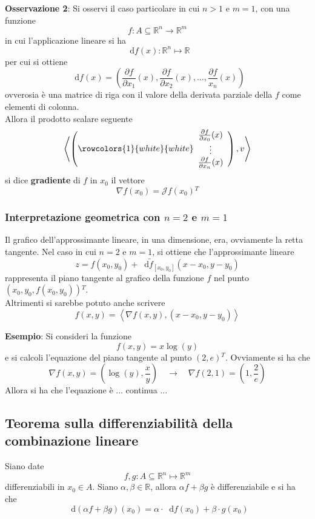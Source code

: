 \documentclass[a4paper]{extarticle}
\newcommand*\dif{\mathop{}\!\mathrm{d}}
\begin{document}
\vspace{2em}
\noindent
\textbf{Osservazione 2}: Si osservi il caso particolare in cui $n>1$ e $m=1$, con una funzione
\[f : A \subseteq \mathbb{R}^n \rightarrow \mathbb{R}^m\]
in cui l'applicazione lineare si ha
\[\dif f(x) : \mathbb{R}^n \longmapsto \mathbb{R}\]
per cui si ottiene
\[\dif f(x) = \left(\frac{\partial f}{\partial x_1}(x), \frac{\partial f}{\partial x_2}(x), \dots, \frac{\partial f}{x_n}(x) \right)\]
ovverosia è una matrice di riga con il valore della derivata parziale della $f$ come elementi di colonna.\\
Allora il prodotto scalare seguente
\[\left<
    \left(
        \rowcolors{1}{white}{white}
        \begin{array}{c}
            \frac{\partial f}{\partial x_0}(x)\\
            \vdots\\
            \frac{\partial f}{\partial x_n}(x)
        \end{array}
    \right), v
\right>\]
si dice \textbf{gradiente} di $f$ in $x_0$ il vettore
\[\nabla f(x_0) = \mathcal{J}f(x_0){^T}\]

\vspace{2em}
\noindent
\subsubsection{Interpretazione geometrica con $n=2$ e $m=1$}
Il grafico dell'approssimante lineare, in una dimensione, era, ovviamente la retta tangente. Nel caso in cui $n=2$ e $m=1$, si ottiene che l'approssimante lineare
\[z=f(x_0,y_0) + \dif \widetilde{f}_{[x_0,y_0]}(x-x_0,y-y_0)\]
rappresenta il piano tangente al grafico della funzione $f$ nel punto $\left(x_0,y_0,f(x_0,y_0)\right){^T}$.\\
Altrimenti si sarebbe potuto anche scrivere
\[f(x,y) = \left<\nabla f(x,y), (x-x_0,y-y_0)\right>\]

\vspace{1em}
\noindent
\textbf{Esempio}: Si consideri la funzione
\[f(x,y)=x \log(y)\]
e si calcoli l'equazione del piano tangente al punto $(2,e){^T}$. Ovviamente si ha che
\[\nabla f(x,y) = \left(\log(y),\frac{x}{y}\right) \hspace{1em} \rightarrow \hspace{1em} \nabla f(2,1) = \left(1,\frac{2}{e}\right)\]
Allora si ha che l'equazione è
... continua ...

\vspace{1em}
\noindent
\subsection{Teorema sulla differenziabilità della combinazione lineare}
Siano date
\[f,g : A \subseteq \mathbb{R}^n \longmapsto \mathbb{R}^m\]
differenziabili in $x_0 \in A$. Siano $\alpha, \beta \in \mathbb{R}$, allora $\alpha f + \beta g$ è differenziabile e si ha che
\[\dif \left(\alpha f + \beta g\right)(x_0) = \alpha \cdot \dif f(x_0) + \beta \cdot g(x_0)\]
\end{document}
